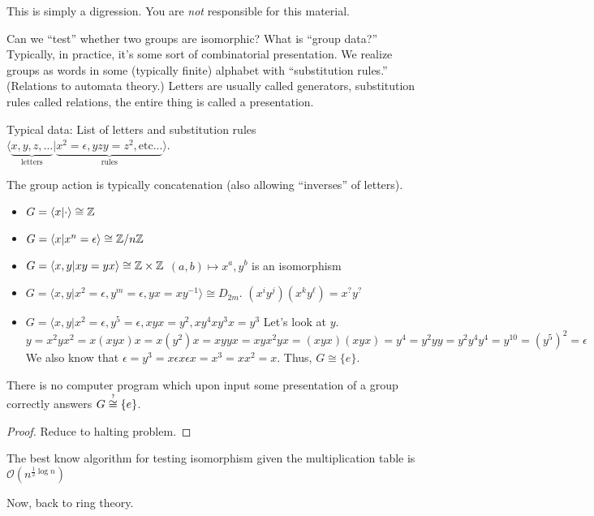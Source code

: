 \documentclass[notes.tex]{subfiles}
\begin{document}

\begin{digression}
	This is simply a digression. You are \emph{not} responsible for this material.

	Can we ``test'' whether two groups are isomorphic?
	What is ``group data?'' Typically, in practice, it's some sort of combinatorial presentation. We realize groups as words in some (typically finite) alphabet with ``substitution rules.'' (Relations to automata theory.)
	Letters are usually called generators, substitution rules called relations, the entire thing is called a presentation.

	Typical data: List of letters and substitution rules 
	$\langle \underbrace{x, y, z, \ldots}_{\text{letters}} | \underbrace{x^2 = \epsilon, yzy = z^2, \text{etc...}}_{\text{rules}} \rangle$. 

	The group action is typically concatenation (also allowing ``inverses'' of letters).
	\begin{eg}\leavevmode
		\begin{itemize}
			\item $G = \langle x | \cdot \rangle \cong \mathbb{Z}$
			\item $G = \langle x | x^n = \epsilon \rangle \cong \mathbb{Z}/n\mathbb{Z}$
			\item $G = \langle x, y | xy = yx \rangle \cong \mathbb{Z} \times \mathbb{Z}$
			$(a, b)\mapsto x^a, y^b$ is an isomorphism
			\item $G = \langle x, y | x^2 = \epsilon, y^m=\epsilon, yx = xy^{-1} \rangle \cong D_{2m}$.
			$(x^iy^j)(x^ky^\ell) = x^?y^?$
			\item $G = \langle x, y | x^2=\epsilon, y^5=\epsilon, xyx=y^2, xy^4xy^3x = y^3$
			Let's look at $y$. $y=x^2yx^2= x(xyx)x=x(y^2)x=xyyx=xyx^2yx=(xyx)(xyx)=y^4=y^2yy=y^2y^4y^4 = y^{10}= (y^5)^2 = \epsilon$ We also know that $\epsilon=y^3 = x\epsilon x \epsilon x = x^3 = xx^2= x$. Thus, $G\cong\{e\}$.
		\end{itemize}
		\begin{theorem*}
			There is no computer program which upon input some presentation of a group correctly answers $G\overop{\cong}{?}\{e\}$.
		\end{theorem*}
		\begin{proof}
			Reduce to halting problem.
		\end{proof}
	\end{eg}
	The best know algorithm for testing isomorphism given the multiplication table is $\mathcal{O}(n^{\frac12\log n})$

	Now, back to ring theory.
\end{digression}
\end{document}
